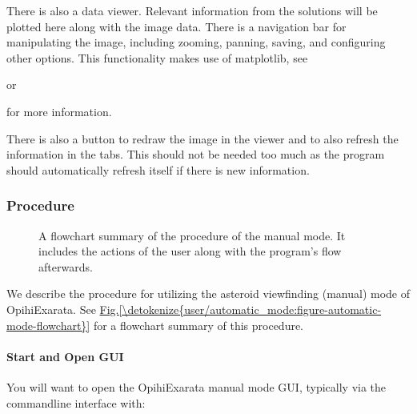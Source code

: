 \documentclass[letterpaper,11pt,english]{sphinxmanual}
\begin{document}
\sphinxAtStartPar
There is also a data viewer. Relevant information from the solutions will be
plotted here along with the image data. There is a navigation bar for
manipulating the image, including zooming, panning, saving, and configuring
other options. This functionality makes use of matplotlib, see
%
\begin{footnote}[4]\sphinxAtStartFootnote
{}
%
\end{footnote}
or %
\begin{footnote}[5]\sphinxAtStartFootnote
{}
%
\end{footnote}
for more information.

\sphinxAtStartPar
There is also a  button to redraw the image in the
viewer and to also refresh the information in the tabs. This should not be
needed too much as the program should automatically refresh itself if there
is new information.


\subsubsection{Procedure}
\label{\detokenize{user/manual_mode:procedure}}
\begin{figure}[H]
\centering
\capstart

\noindent{}
\caption{A flowchart summary of the procedure of the manual mode. It includes
the actions of the user along with the program’s flow afterwards.}\label{\detokenize{user/manual_mode:id3}}\label{\detokenize{user/manual_mode:figure-manual-mode-flowchart}}\end{figure}

\sphinxAtStartPar
We describe the procedure for utilizing the asteroid view\sphinxhyphen{}finding (manual)
mode of OpihiExarata. See \hyperref[\detokenize{user/automatic_mode:figure-automatic-mode-flowchart}]{Fig.\@ \ref{\detokenize{user/automatic_mode:figure-automatic-mode-flowchart}}} for a
flowchart summary of this procedure.


\paragraph{Start and Open GUI}
\label{\detokenize{user/manual_mode:start-and-open-gui}}
\sphinxAtStartPar
You will want to open the OpihiExarata manual mode GUI, typically via the
command\sphinxhyphen{}line interface with:
\end{document}
